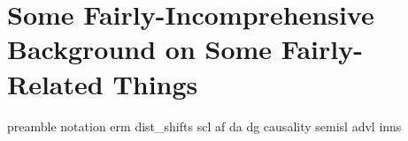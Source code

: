 \chapter{
  Some Fairly-Incomprehensive Background on Some Fairly-Related Things
}\label{ch:background}
{preamble}
{notation}
{erm}
{dist_shifts}
{scl}
{af}
{da}
{dg}
{causality}
{semisl}
{advl}
{inns}

